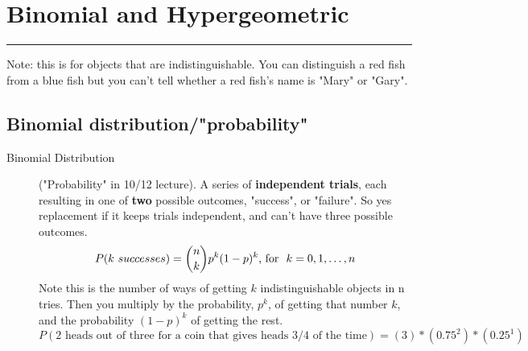 \section{Binomial and Hypergeometric}\smallskip \hrule height 2pt \smallskip
Note: this is for objects that are indistinguishable.  You can distinguish a red fish from a blue fish but you can't tell whether a red fish's name is "Mary" or "Gary". 
\hfill \\

\subsection{Binomial distribution/"probability"}
	\begin{description}
		
		\item[Binomial Distribution] ("Probability" in 10/12 lecture). A series of \textbf{independent trials}, each resulting in one of \textbf{two} possible outcomes, "success", or "failure".  So yes replacement if it keeps trials independent, and can't have three possible outcomes. 
			\[ P(k \mbox \ successes) = {{n}\choose{k}}p^k(1-p)^k \mbox{, for \ } k = 0, 1, \dots, n \]
		Note this is the number of ways of getting $k$ indistinguishable objects in n tries.  Then you multiply by the probability, $p^k$, of getting that number $k$, and the probability $(1-p)^k$ of getting the rest.  $P(\mbox{2 heads out of three for a coin that gives heads 3/4 of the time}) = (3)*(0.75^2)*(0.25^1)$ \hfill \\
		\hfill \\
	\end{description}

